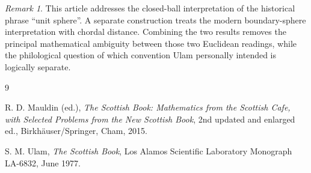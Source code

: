 \documentclass[11pt]{amsart}
\theoremstyle{definition}
\theoremstyle{remark}
\newtheorem{remark}[theorem]{Remark}
\begin{document}
\begin{remark}
This article addresses the closed-ball interpretation of the historical phrase ``unit sphere''.  A separate construction treats the modern boundary-sphere interpretation with chordal distance.  Combining the two results removes the principal mathematical ambiguity between those two Euclidean readings, while the philological question of which convention Ulam personally intended is logically separate.
\end{remark}

\begin{thebibliography}{9}

R. D. Mauldin (ed.),
\emph{The Scottish Book: Mathematics from the Scottish Cafe, with Selected Problems from the New Scottish Book},
2nd updated and enlarged ed., Birkh\"auser/Springer, Cham, 2015.

S. M. Ulam,
\emph{The Scottish Book},
Los Alamos Scientific Laboratory Monograph LA-6832, June 1977.

\end{thebibliography}
\end{document}
